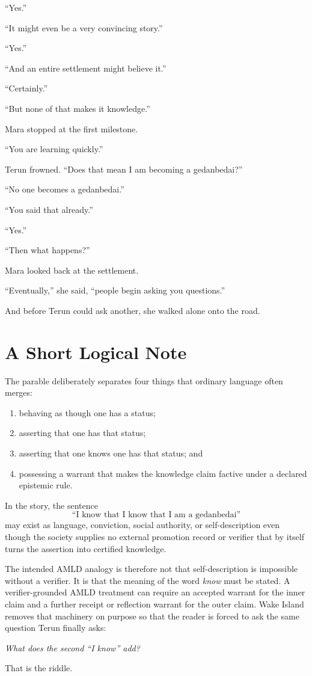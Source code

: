 \documentclass[11pt]{article}
\begin{document}
``Yes.''

``It might even be a very convincing story.''

``Yes.''

``And an entire settlement might believe it.''

``Certainly.''

``But none of that makes it knowledge.''

Mara stopped at the first milestone.

``You are learning quickly.''

Terun frowned. ``Does that mean I am becoming a gedanbedai?''

``No one becomes a gedanbedai.''

``You said that already.''

``Yes.''

``Then what happens?''

Mara looked back at the settlement.

``Eventually,'' she said, ``people begin asking you questions.''

And before Terun could ask another, she walked alone onto the road.

\newpage
\section*{A Short Logical Note}

The parable deliberately separates four things that ordinary language often merges:

\begin{enumerate}[leftmargin=1.5em]
\item behaving as though one has a status;
\item asserting that one has that status;
\item asserting that one knows one has that status; and
\item possessing a warrant that makes the knowledge claim factive under a declared epistemic rule.
\end{enumerate}

In the story, the sentence
\[
\text{``I know that I know that I am a gedanbedai''}
\]
may exist as language, conviction, social authority, or self-description even though the society supplies no external promotion record or verifier that by itself turns the assertion into certified knowledge.

The intended AMLD analogy is therefore not that self-description is impossible without a verifier. It is that the meaning of the word \emph{know} must be stated. A verifier-grounded AMLD treatment can require an accepted warrant for the inner claim and a further receipt or reflection warrant for the outer claim. Wake Island removes that machinery on purpose so that the reader is forced to ask the same question Terun finally asks:

\begin{center}
\emph{What does the second ``I know'' add?}
\end{center}

That is the riddle.
\end{document}
